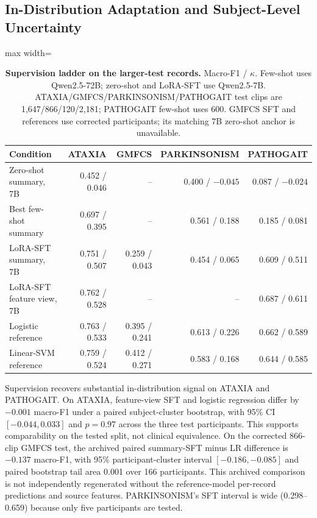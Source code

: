 \subsection{In-Distribution Adaptation and Subject-Level Uncertainty}
\label{sec:supp_adaptation}

\begin{table}[H]
\centering
\caption{\textbf{Supervision ladder on the larger-test records.} Macro-F1 / $\kappa$. Few-shot uses Qwen2.5-72B; zero-shot and LoRA-SFT use Qwen2.5-7B. ATAXIA/GMFCS/PARKINSONISM/PATHOGAIT test clips are 1,647/866/120/2,181; PATHOGAIT few-shot uses 600. GMFCS SFT and references use corrected participants; its matching 7B zero-shot anchor is unavailable.}
\label{tab:adaptation_ladder}
\small
\begin{adjustbox}{max width=\textwidth}
\begin{tabular}{lrrrr}
\toprule
Condition & ATAXIA & GMFCS & PARKINSONISM & PATHOGAIT \\
\midrule
Zero-shot summary, 7B & 0.452 / 0.046 & -- & 0.400 / $-0.045$ & 0.087 / $-0.024$ \\
Best few-shot summary & 0.697 / 0.395 & -- & 0.561 / 0.188 & 0.185 / 0.081 \\
LoRA-SFT summary, 7B & 0.751 / 0.507 & 0.259 / 0.043 & 0.454 / 0.065 & 0.609 / 0.511 \\
LoRA-SFT feature view, 7B & 0.762 / 0.528 & -- & -- & 0.687 / 0.611 \\
Logistic reference & 0.763 / 0.533 & 0.395 / 0.241 & 0.613 / 0.226 & 0.662 / 0.589 \\
Linear-SVM reference & 0.759 / 0.524 & 0.412 / 0.271 & 0.583 / 0.168 & 0.644 / 0.585 \\
\bottomrule
\end{tabular}
\end{adjustbox}
\end{table}

Supervision recovers substantial in-distribution signal on ATAXIA and PATHOGAIT. On ATAXIA, feature-view SFT and logistic regression differ by $-0.001$ macro-F1 under a paired subject-cluster bootstrap, with 95\% CI $[-0.044,0.033]$ and $p=0.97$ across the three test participants. This supports comparability on the tested split, not clinical equivalence. On the corrected 866-clip GMFCS test, the archived paired summary-SFT minus LR difference is $-0.137$ macro-F1, with 95\% participant-cluster interval $[-0.186,-0.085]$ and paired bootstrap tail area 0.001 over 166 participants. This archived comparison is not independently regenerated without the reference-model per-record predictions and source features. PARKINSONISM's SFT interval is wide (0.298--0.659) because only five participants are tested.

